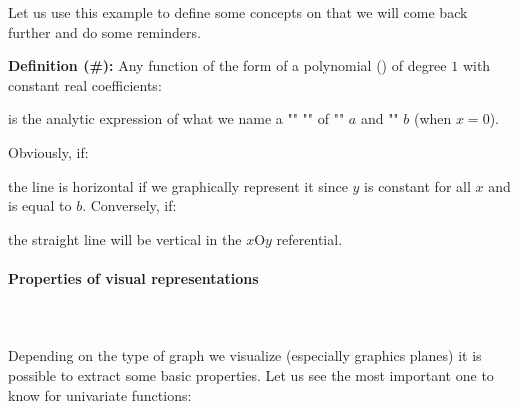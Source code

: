 	Let us use this example to define some concepts on that we will come back further and do some reminders.
	
	\textbf{Definition (\#\mydef):} Any function of the form of a polynomial () of degree $1$ with constant real coefficients:
	
	is the analytic expression of what we name a "\label{straight line}" "" of "" $a$ and "" $b$ (when $x=0$).
	
	Obviously, if:
	
	the line is horizontal if we graphically represent it since $y$ is constant for all $x$ and is equal to $b$. Conversely, if:
	
	the straight line will be vertical in the $x\text{O}y$ referential.
	
	\paragraph{Properties of visual representations}\mbox{}\\\\
	Depending on the type of graph we visualize (especially graphics planes) it is possible to extract some basic properties. Let us see the most important one to know for univariate functions:
	
